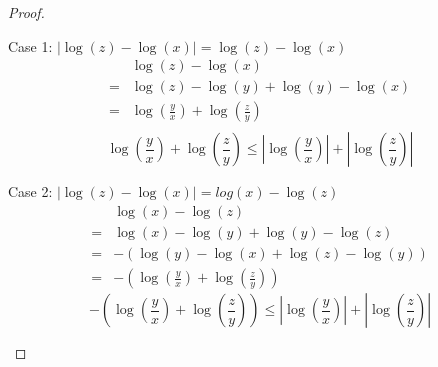 \documentclass[12pt,a4paper,reqno,parskip=full]{amsart}
\numberwithin{equation}{section}
\theoremstyle{plain}
\theoremstyle{definition}
\renewcommand{\leq}{\leqslant}
\begin{document}
\begin{enumerate}
\begin{proof}
\begin{enumerate}
                  Case 1: $|\log(z) - \log(x)| = \log(z) - \log(x) $
                  \begin{align*}
                      & \log(z) - \log(x)                                           \\
                    = & \log(z) - \log(y) + \log(y) - \log(x)                       \\
                    = & \log\left(\frac{y}{x}\right) + \log\left(\frac{z}{y}\right) \\
                  \end{align*}
                  \[\log\left(\frac{y}{x}\right) + \log\left(\frac{z}{y}\right) \leq \left|\log\left(\frac{y}{x}\right)\right| + \left|\log\left(\frac{z}{y}\right)\right|\]

                  Case 2:  $|\log(z) - \log(x)| = log(x) - \log(z)$
                  \begin{align*}
                      & \log(x) - \log(z)                        \\
                    = & \log(x) - \log(y) + \log(y) - \log(z)    \\
                    = & -(\log(y) - \log(x) + \log(z) - \log(y)) \\
                    = & -\left(\log\left(\frac{y}{x}\right) + \log\left(\frac{z}{y}\right)\right)
                  \end{align*}
                  \[-\left(\log\left(\frac{y}{x}\right) + \log\left(\frac{z}{y}\right)\right) \leq \left|\log\left(\frac{y}{x}\right)\right| + \left|\log\left(\frac{z}{y}\right)\right|\]
          \end{enumerate}
        \end{proof}
\end{enumerate}
\end{document}
